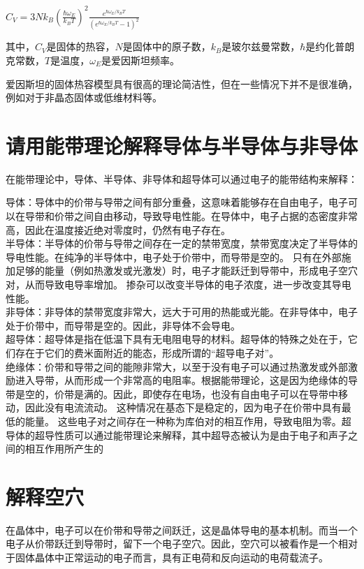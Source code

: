 \documentclass[12pt, a4paper, oneside]{ctexart}
\begin{document}
\begin{spacing}{2.0}
$C_V=3Nk_B\left(\frac{\hbar\omega_E}{k_B T}\right)^2\frac{e^{\hbar\omega_E/k_B T}}{\left(e^{\hbar\omega_E/k_B T}-1\right)^2}$

其中，$C_V$是固体的热容，$N$是固体中的原子数，$k_B$是玻尔兹曼常数，$\hbar$是约化普朗克常数，$T$是温度，$\omega_E$是爱因斯坦频率。

爱因斯坦的固体热容模型具有很高的理论简洁性，但在一些情况下并不是很准确，例如对于非晶态固体或低维材料等。

\section{请用能带理论解释导体与半导体与非导体}
在能带理论中，导体、半导体、非导体和超导体可以通过电子的能带结构来解释：

导体：导体中的价带与导带之间有部分重叠，这意味着能够存在自由电子，电子可以在导带和价带之间自由移动，导致导电性能。在导体中，电子占据的态密度非常高，因此在温度接近绝对零度时，仍然有电子存在。
\\
半导体：半导体的价带与导带之间存在一定的禁带宽度，禁带宽度决定了半导体的导电性能。在纯净的半导体中，电子处于价带中，而导带是空的。
只有在外部施加足够的能量（例如热激发或光激发）时，电子才能跃迁到导带中，形成电子空穴对，从而导致电导率增加。
掺杂可以改变半导体的电子浓度，进一步改变其导电性能。\\

非导体：非导体的禁带宽度非常大，远大于可用的热能或光能。在非导体中，电子处于价带中，而导带是空的。因此，非导体不会导电。\\

超导体：超导体是指在低温下具有无电阻电导的材料。超导体的特殊之处在于，它们存在于它们的费米面附近的能态，形成所谓的“超导电子对”。\\
绝缘体：价带和导带之间的能隙非常大，以至于没有电子可以通过热激发或外部激励进入导带，从而形成一个非常高的电阻率。根据能带理论，这是因为绝缘体的导带是空的，价带是满的。因此，即使存在电场，也没有自由电子可以在导带中移动，因此没有电流流动。
这种情况在基态下是稳定的，因为电子在价带中具有最低的能量。
这些电子对之间存在一种称为库伯对的相互作用，导致电阻为零。超导体的超导性质可以通过能带理论来解释，其中超导态被认为是由于电子和声子之间的相互作用所产生的
\section{解释空穴}
在晶体中，电子可以在价带和导带之间跃迁，这是晶体导电的基本机制。而当一个电子从价带跃迁到导带时，留下一个电子空穴。因此，空穴可以被看作是一个相对于固体晶体中正常运动的电子而言，具有正电荷和反向运动的电荷载流子。


\end{spacing}
\end{document}
